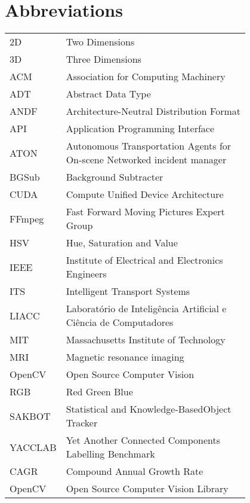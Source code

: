 \chapter*{Abbreviations}

\begin{flushleft}
\begin{tabular}{l p{0.8\linewidth}}

2D		& Two Dimensions \\
3D		& Three Dimensions \\
ACM		& Association for Computing Machinery \\
ADT		& Abstract Data Type \\
ANDF	& Architecture-Neutral Distribution Format \\
API 	& Application Programming Interface \\
ATON 	& Autonomous Transportation Agents for On-scene Networked incident manager \\
BGSub 	& Background Subtracter \\
CUDA 	& Compute Unified Device Architecture \\
FFmpeg	& Fast Forward Moving Pictures Expert Group \\
HSV		& Hue, Saturation and Value \\
IEEE	& Institute of Electrical and Electronics Engineers \\
ITS 	& Intelligent Transport Systems \\
LIACC 	& Laboratório de Inteligência Artificial e Ciência de Computadores \\
MIT		& Massachusetts Institute of Technology \\
MRI 	& Magnetic resonance imaging \\ 
OpenCV 	& Open Source Computer Vision \\
RGB 	& Red Green Blue \\
SAKBOT	& Statistical and Knowledge-BasedObject Tracker\\
YACCLAB & Yet Another Connected Components Labelling Benchmark \\
CAGR	& Compound Annual Growth Rate \\
OpenCV	& Open Source Computer Vision Library
\end{tabular}
\end{flushleft}

